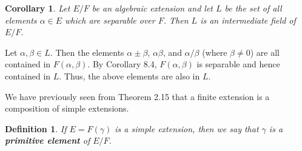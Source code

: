 \documentclass[10pt]{article}
\makeatletter
\theoremstyle{newstyle}
\newtheorem{cor}[thm]{Corollary}
\newtheorem{defn}[thm]{Definition}
\newenvironment{pf}[1][\proofname]{\par
  \pushQED{\qed}%
  \normalfont \topsep0\p@\relax
  \trivlist
  \item[\hskip\labelsep\scshape
  #1\@addpunct{.}]\ignorespaces
}{%
  \popQED\endtrivlist\@endpefalse
}
\makeatother
\begin{document}
\begin{cor}
Let $E/F$ be an algebraic extension and let $L$ be the set of all elements $\alpha \in E$ 
which are separable over $F$. Then $L$ is an intermediate field of $E/F$. 
\end{cor}
\begin{pf}
Let $\alpha, \beta \in L$. Then the elements $\alpha\pm\beta$, $\alpha\beta$, and 
$\alpha/\beta$ (where $\beta \neq 0$) are all contained in $F(\alpha, \beta)$. By Corollary 8.4, 
$F(\alpha, \beta)$ is separable and hence contained in $L$. Thus, the above elements are also in $L$. 
\end{pf}

We have previously seen from Theorem 2.15 that a finite extension is a composition of simple extensions.

\begin{defn}
If $E = F(\gamma)$ is a simple extension, then we say that $\gamma$ is a {\bf primitive element} of $E/F$.
\end{defn}
\end{document}
